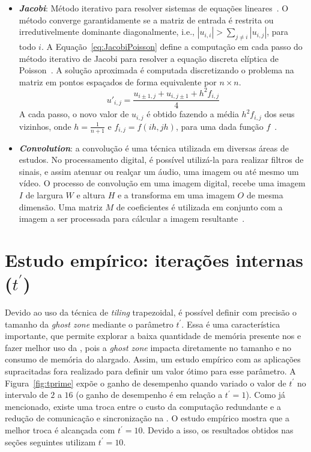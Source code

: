 \begin{itemize}
  \item \textbf{\textit{Jacobi}}: Método iterativo para resolver sistemas de equações lineares~\cite{demmel97}.
  O método converge garantidamente se a matriz de entrada é restrita ou irredutivelmente dominante diagonalmente, i.e., $|u_{i,i}| > \sum_{j\neq i}{|u_{i,j}|}$, para todo $i$.
  A Equação~\ref{eq:JacobiPoisson} define a computação em cada passo do método iterativo de Jacobi para resolver a equação discreta elíptica de Poisson~\cite{demmel97}. A solução aproximada é computada discretizando o problema na matriz em pontos espaçados de forma equivalente por $n\times n$.\\
   \begin{equation}
   u'_{i,j} = \frac{u_{i\pm1,j} + u_{i,j\pm1} + h^2f_{i,j}}{4}
   \label{eq:JacobiPoisson}
   \end{equation}
   A cada passo, o novo valor de $u_{i,j}$ é obtido fazendo a média $h^2f_{i,j}$ dos seus vizinhos, onde $h = \frac{1}{n+1}$ e $f_{i,j} = f(ih,jh)$,
   para uma dada função $f$~\cite{Podesta:TCC}.

  \item \textbf{\textit{Convolution}}: a convolução é uma técnica utilizada em diversas áreas de estudos. No processamento digital, é possível utilizá-la para realizar filtros de sinais, e assim atenuar ou realçar um áudio, uma imagem ou até mesmo um vídeo. O processo de convolução em uma imagem digital, recebe uma imagem $\mathit{I}$ de largura $\mathit{W}$ e altura $\mathit{H}$ e a transforma em uma imagem $\mathit{O}$ de mesma dimensão. Uma matriz $\mathit{M}$ de coeficientes é utilizada em conjunto com a imagem a ser processada para cálcular a imagem resultante~\cite{CPE:CPE3479}.
\end{itemize}

\section{Estudo empírico: iterações internas (\texorpdfstring{$t^\prime$}{t'})}
\label{sec:tam_tile_alargado}

Devido ao uso da técnica de \textit{tiling} trapezoidal, é possível definir com precisão o tamanho da \textit{ghost zone} mediante o parâmetro $t^\prime$. Essa é uma característica importante, que permite explorar a baixa quantidade de memória presente nos \clusters e fazer melhor uso da \noc, pois a \textit{ghost zone} impacta diretamente no tamanho e no consumo de memória do \tile alargado. Assim, um estudo empírico com as aplicações supracitadas fora realizado para definir um valor ótimo para esse parâmetro. A Figura~\ref{fig:tprime} expõe o ganho de desempenho quando variado o valor de $t^\prime$ no intervalo de $2$ a $16$ (o ganho de desempenho é em relação a $t^\prime=1$). Como já mencionado, existe uma troca entre o custo da computação redundante e a redução de comunicação e sincronização na \noc. O estudo empírico mostra que a melhor troca é alcançada com $t^\prime=10$. Devido a isso, os resultados obtidos nas seções seguintes utilizam $t^\prime=10$.

